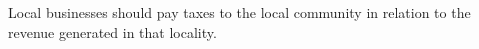 Local businesses should pay taxes to the local community in relation to the revenue generated in that locality.